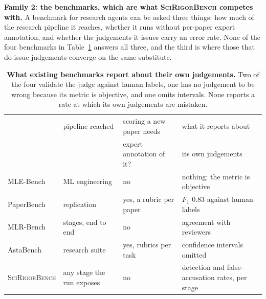 \documentclass[10pt]{article}
\begin{document}
\textbf{Family 2: the benchmarks, which are what \textsc{SciRigorBench} competes with.}
A benchmark for research agents can be asked three things: how much of the
research pipeline it reaches, whether it runs without per-paper expert
annotation, and whether the judgements it issues carry an error rate. None of the
four benchmarks in Table~\ref{tab:benchcmp} answers all three, and the third is
where those that do issue judgements converge on the same substitute.

\begin{table}[t]
\centering\small
\begin{tabular}{@{}llll@{}}
\toprule
& pipeline reached & scoring a new paper needs & what it reports about \\
& & expert annotation of it? & its own judgements \\
\midrule
MLE-Bench \cite{chan2025mlebench}
 & ML engineering & no & nothing: the metric is objective \\
PaperBench \cite{starace2025paperbench}
 & replication & yes, a rubric per paper & $F_1$ 0.83 against human labels \\
MLR-Bench \cite{mlrbench}
 & stages, end to end & no & agreement with reviewers \\
AstaBench \cite{asta2025}
 & research suite & yes, rubrics per task & confidence intervals omitted \\
\midrule
\textsc{SciRigorBench} & any stage the run exposes & no & detection and false-accusation
rates, per stage \\
\bottomrule
\end{tabular}
\caption{\textbf{What existing benchmarks report about their own judgements.}
Two of the four validate the judge against human labels, one has no judgement to
be wrong because its metric is objective, and one omits intervals. None reports
a rate at which its own judgements are mistaken.}
\label{tab:benchcmp}
\end{table}
\end{document}
